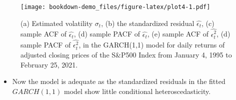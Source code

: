 \documentclass[]{book}
\newenvironment{Shaded}{\begin{snugshade}}{\end{snugshade}}
\newcommand{\DataTypeTok}[1]{\textcolor[rgb]{0.13,0.29,0.53}{#1}}
\newcommand{\DecValTok}[1]{\textcolor[rgb]{0.00,0.00,0.81}{#1}}
\newcommand{\KeywordTok}[1]{\textcolor[rgb]{0.13,0.29,0.53}{\textbf{#1}}}
\newcommand{\NormalTok}[1]{#1}
\newcommand{\OperatorTok}[1]{\textcolor[rgb]{0.81,0.36,0.00}{\textbf{#1}}}
\newcommand{\OtherTok}[1]{\textcolor[rgb]{0.56,0.35,0.01}{#1}}
\newcommand{\StringTok}[1]{\textcolor[rgb]{0.31,0.60,0.02}{#1}}
\providecommand{\tightlist}{%
  \setlength{\itemsep}{0pt}\setlength{\parskip}{0pt}}
\begin{document}
\begin{Shaded}
\end{Shaded}

\begin{figure}
\centering
\texttt{[image: bookdown-demo\_files/figure-latex/plot4-1.pdf]}
\caption{\label{fig:plot4}(a) Estimated volatility \(\hat{\sigma_t}\), (b) the standardized residual \(\hat{\epsilon_t}\), (c) sample ACF of \(\hat{\epsilon_t}\), (d) sample PACF of \(\hat{\epsilon_t}\), (e) sample ACF of \(\hat{\epsilon_t^2}\), (d) sample PACF of \(\hat{\epsilon_t^2}\), in the GARCH(1,1) model for daily returns of adjusted closing prices of the S\&P500 Index from January 4, 1995 to February 25, 2021.}
\end{figure}

\begin{itemize}
\tightlist
\item
  Now the model is adequate as the standardized residuals in the fitted \(GARCH(1,1)\) model show little conditional heteroscedasticity.
\end{itemize}
\end{document}
